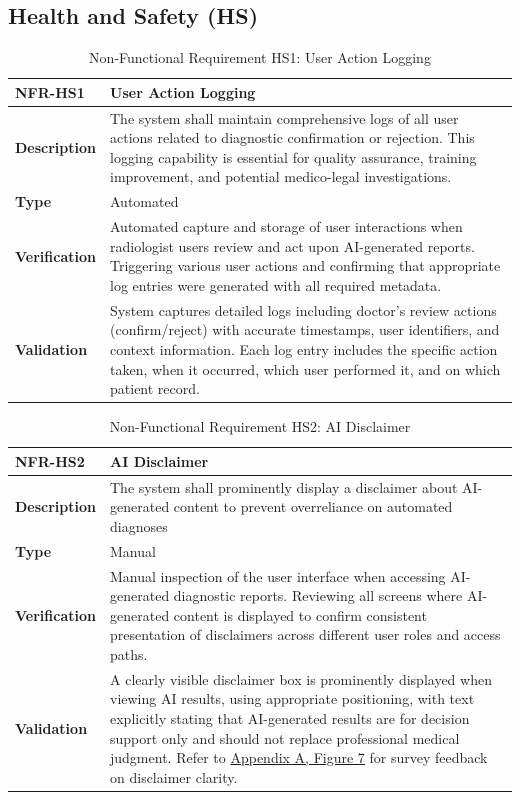 \documentclass[12pt, titlepage]{article}
\begin{document}
\subsection{Health and Safety (HS)}
\begin{table}[h!]
\centering
{}
\begin{tabular}{|p{3.5cm}|p{11.5cm}|}
\hline
\rowcolor{gray!30}
\textbf{NFR-HS1} & \textbf{User Action Logging} \\
\hline
\textbf{Description} & The system shall maintain comprehensive logs of all user actions related to diagnostic confirmation or rejection. This logging capability is essential for quality assurance, training improvement, and potential medico-legal investigations. \\
\hline
\textbf{Type} & Automated \\
\hline
\textbf{Verification} & Automated capture and storage of user interactions when radiologist users review and act upon AI-generated reports. Triggering various user actions and confirming that appropriate log entries were generated with all required metadata. \\
\hline
\textbf{Validation} & System captures detailed logs including doctor's review actions (confirm/reject) with accurate timestamps, user identifiers, and context information. Each log entry includes the specific action taken, when it occurred, which user performed it, and on which patient record. \\
\hline
\end{tabular}
\caption{Non-Functional Requirement HS1: User Action Logging}
\end{table}

\begin{table}[H]
\centering
{}
\begin{tabular}{|p{3.5cm}|p{11.5cm}|}
\hline
\rowcolor{gray!30}
\textbf{NFR-HS2} & \textbf{AI Disclaimer} \\
\hline
\textbf{Description} & The system shall prominently display a disclaimer about AI-generated content to prevent overreliance on automated diagnoses \\
\hline
\textbf{Type} & Manual \\
\hline
\textbf{Verification} & Manual inspection of the user interface when accessing AI-generated diagnostic reports. Reviewing all screens where AI-generated content is displayed to confirm consistent presentation of disclaimers across different user roles and access paths. \\
\hline
\textbf{Validation} & A clearly visible disclaimer box is prominently displayed when viewing AI results, using appropriate positioning, with text explicitly stating that AI-generated results are for decision support only and should not replace professional medical judgment. Refer to \hyperref[appendix:A]{Appendix A, Figure 7} for survey feedback on disclaimer clarity. \\
\hline
\end{tabular}
\caption{Non-Functional Requirement HS2: AI Disclaimer}
\end{table}
\end{document}
